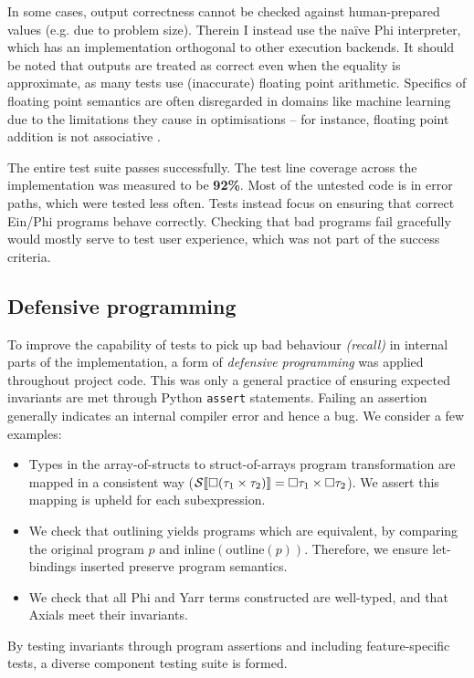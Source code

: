In some cases, output correctness cannot be checked against human-prepared values (e.g. due to problem size). Therein I instead use the na\"ive Phi interpreter, which has an implementation orthogonal to other execution backends. 
It should be noted that outputs are treated as correct even when the equality is approximate, as many tests use (inaccurate) floating point arithmetic. 
Specifics of floating point semantics are often disregarded in domains like machine learning due to the limitations they cause in optimisations -- for instance, floating point addition is not associative \cite{alawi2004every}.

The entire test suite passes successfully. The test line coverage across the implementation was measured to be \textbf{92\%}. Most of the untested code is in error paths, which were tested less often. Tests instead focus on ensuring that correct Ein/Phi programs behave correctly. Checking that bad programs fail gracefully would mostly serve to test user experience, which was not part of the success criteria.

\subsection{Defensive programming}

To improve the capability of tests to pick up bad behaviour \textit{(recall)} in internal parts of the implementation, a form of \textit{defensive programming} was applied throughout project code.
This was only a general practice of ensuring expected invariants are met through Python \texttt{assert} statements. Failing an assertion generally indicates an internal compiler error and hence a bug. We consider a few examples: \begin{itemize}
    \item Types in the array-of-structs to struct-of-arrays program transformation are mapped in a consistent way ($\phisoa{\phivectype{(\phipairtype{\tau_1}{\tau_2}})} = \phipairtype{\phivectype{\tau_1}}{\phivectype{\tau_2}}$). We assert this mapping is upheld for each subexpression.
    \item We check that outlining yields programs which are equivalent, by comparing the original program $p$ and $\mathrm{inline}(\mathrm{outline}(p))$. Therefore, we ensure let-bindings inserted preserve program semantics.
    \item We check that all Phi and Yarr terms constructed are well-typed, and that Axials meet their invariants.
\end{itemize}
By testing invariants through program assertions and including feature-specific tests, a diverse component testing suite is formed. 

